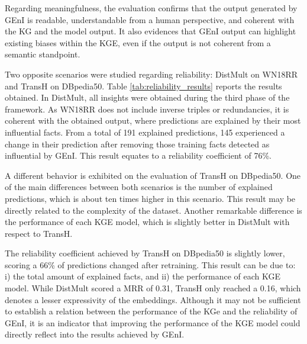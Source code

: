 Regarding meaningfulness, the evaluation confirms that the output generated by GEnI is readable, understandable from a human perspective, and coherent with the KG and the model output. It also evidences that GEnI output can highlight existing biases within the KGE, even if the output is not coherent from a semantic standpoint.

Two opposite scenarios were studied regarding reliability: DistMult on WN18RR and TransH on DBpedia50. Table \ref{tab:reliability_results} reports the results obtained. In DistMult, all insights were obtained during the third phase of the framework. As WN18RR does not include inverse triples or redundancies, it is coherent with the obtained output, where predictions are explained by their most influential facts. From a total of 191 explained predictions, 145 experienced a change in their prediction after removing those training facts detected as influential by GEnI. This result equates to a reliability coefficient of 76\%.

A different behavior is exhibited on the evaluation of TransH on DBpedia50. One of the main differences between both scenarios is the number of explained predictions, which is about ten times higher in this scenario. This result may be directly related to the complexity of the dataset. Another remarkable difference is the performance of each KGE model, which is slightly better in DistMult with respect to TransH.

The reliability coefficient achieved by TransH on DBpedia50 is slightly lower, scoring a 66\% of predictions changed after retraining. This result can be due to: i) the total amount of explained facts, and ii) the performance of each KGE model. While DistMult scored a MRR of 0.31, TransH only reached a 0.16, which denotes a lesser expressivity of the embeddings. Although it may not be sufficient to establish a relation between the performance of the KGe and the reliability of GEnI, it is an indicator that improving the performance of the KGE model could directly reflect into the results achieved by GEnI.


